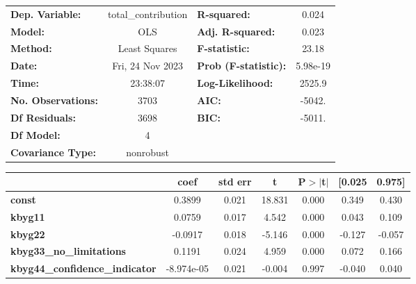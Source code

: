 \begin{center}
\begin{tabular}{lclc}
\toprule
\textbf{Dep. Variable:}                & total\_contribution & \textbf{  R-squared:         } &     0.024   \\
\textbf{Model:}                        &         OLS         & \textbf{  Adj. R-squared:    } &     0.023   \\
\textbf{Method:}                       &    Least Squares    & \textbf{  F-statistic:       } &     23.18   \\
\textbf{Date:}                         &   Fri, 24 Nov 2023  & \textbf{  Prob (F-statistic):} &  5.98e-19   \\
\textbf{Time:}                         &       23:38:07      & \textbf{  Log-Likelihood:    } &    2525.9   \\
\textbf{No. Observations:}             &          3703       & \textbf{  AIC:               } &    -5042.   \\
\textbf{Df Residuals:}                 &          3698       & \textbf{  BIC:               } &    -5011.   \\
\textbf{Df Model:}                     &             4       & \textbf{                     } &             \\
\textbf{Covariance Type:}              &      nonrobust      & \textbf{                     } &             \\
\bottomrule
\end{tabular}
\begin{tabular}{lcccccc}
                                       & \textbf{coef} & \textbf{std err} & \textbf{t} & \textbf{P$> |$t$|$} & \textbf{[0.025} & \textbf{0.975]}  \\
\midrule
\textbf{const}                         &       0.3899  &        0.021     &    18.831  &         0.000        &        0.349    &        0.430     \\
\textbf{kbyg11}                        &       0.0759  &        0.017     &     4.542  &         0.000        &        0.043    &        0.109     \\
\textbf{kbyg22}                        &      -0.0917  &        0.018     &    -5.146  &         0.000        &       -0.127    &       -0.057     \\
\textbf{kbyg33\_no\_limitations}       &       0.1191  &        0.024     &     4.959  &         0.000        &        0.072    &        0.166     \\
\textbf{kbyg44\_confidence\_indicator} &   -8.974e-05  &        0.021     &    -0.004  &         0.997        &       -0.040    &        0.040     \\

\end{tabular}
\end{center}
